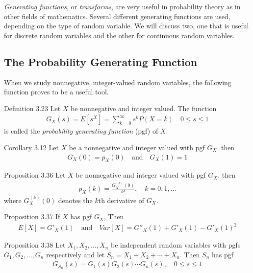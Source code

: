 \textit{Generating functions}, or \textit{transforms}, are very useful in probability theory as in other fields of mathematics. Several different generating functions are used, depending on the type of random variable. We will discuss two, one that is useful for discrete random variables and the other for continuous random variables.

\subsection{The Probability Generating Function}
When we study nonnegative, integer-valued random variables, the following function proves to be a useful tool.

\begin{boks}{Definition 3.23}
  Let $X$ be nonnegative and integer valued. The function
  \begin{align*}
    G_X(s) = E[s^X] = \sum_{k=0}^\infty s^kP(X=k) \quad 0 \leq s \leq 1
  \end{align*}
  is called the \textit{probability generating function} (pgf) of $X$.
\end{boks}

\begin{boks}{Corollary 3.12}
  Let $X$ be a nonnegative and integer valued with pgf $G_X$. then
  \begin{align*}
    G_X(0) = p_X(0) \quad \text{and} \quad G_X(1) = 1
  \end{align*}
\end{boks}

\begin{boks}{Proposition 3.36}
  Let $X$ be nonnegative and integer valued with pgf $G_X$. then
  \begin{align*}
    p_X(k) = \frac{G_X^{(k)}(0)}{k!}, \quad k = 0,1,\ldots
  \end{align*}
  where $G_X^{(k)}(0)$ denotes the $k$th derivative of $G_X$.
\end{boks}

\begin{boks}{Proposition 3.37}
  If $X$ has pgf $G_X$, Then
  \begin{align*}
    E[X] = G'_X(1) \quad \text{and} \quad Var[X] = G''_X(1) + G'_X(1) - G'_X(1)^2
  \end{align*}
\end{boks}

\begin{boks}{Proposition 3.38}
  Let $X_1, X_2, \ldots, X_n$ be independent random variables with pgfs $G_1, G_2, \ldots, G_n$ respectively and let $S_n = X_1 + X_2 + \cdots + X_n$. Then $S_n$ has pgf
  \begin{align*}
    G_{S_n}(s) = G_1(s)G_2(s)\cdots G_n(s), \quad 0 \leq s \leq 1
  \end{align*}
\end{boks}

